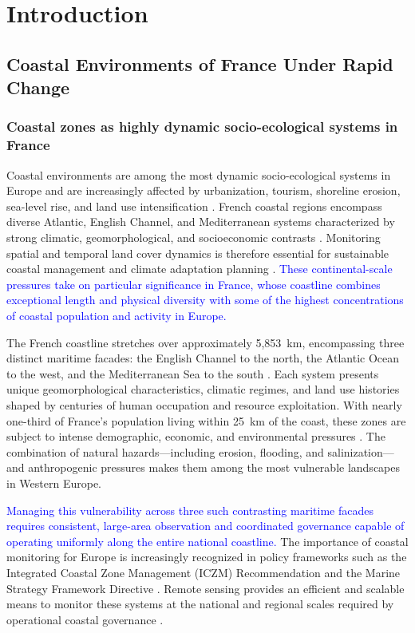 \documentclass[coasts,article,submit,pdftex,moreauthors]{Definitions/mdpi}
\begin{document}
\section{Introduction}

\subsection{Coastal Environments of France Under Rapid Change}

\subsubsection{Coastal zones as highly dynamic socio-ecological systems in France}

Coastal environments are among the most dynamic socio-ecological systems in Europe and are increasingly affected by urbanization, tourism, shoreline erosion, sea-level rise, and land use intensification \citep{Petzold2024,Igigabel2024,IPCCar6wg2}. French coastal regions encompass diverse Atlantic, English Channel, and Mediterranean systems characterized by strong climatic, geomorphological, and socioeconomic contrasts \citep{Karadimitriou2022}. Monitoring spatial and temporal land cover dynamics is therefore essential for sustainable coastal management and climate adaptation planning \citep{Vousdoukas2020,Zambon2023}. \textcolor{blue}{These continental-scale pressures take on particular significance in France, whose coastline combines exceptional length and physical diversity with some of the highest concentrations of coastal population and activity in Europe.}

The French coastline stretches over approximately 5,853~km, encompassing three distinct maritime facades: the English Channel to the north, the Atlantic Ocean to the west, and the Mediterranean Sea to the south \cite{clave2021littoraux}. Each system presents unique geomorphological characteristics, climatic regimes, and land use histories shaped by centuries of human occupation and resource exploitation. With nearly one-third of France's population living within 25~km of the coast, these zones are subject to intense demographic, economic, and environmental pressures \citep{sdes2024merlittoral}. The combination of natural hazards—including erosion, flooding, and salinization—and anthropogenic pressures makes them among the most vulnerable landscapes in Western Europe. 

\textcolor{blue}{Managing this vulnerability across three such contrasting maritime facades requires consistent, large-area observation and coordinated governance capable of operating uniformly along the entire national coastline.} The importance of coastal monitoring for Europe is increasingly recognized in policy frameworks such as the Integrated Coastal Zone Management (ICZM) Recommendation and the Marine Strategy Framework Directive \citep{EEA2019}. Remote sensing provides an efficient and scalable means to monitor these systems at the national and regional scales required by operational coastal governance \citep{Graffin2024,Liu2023}.
\end{document}

